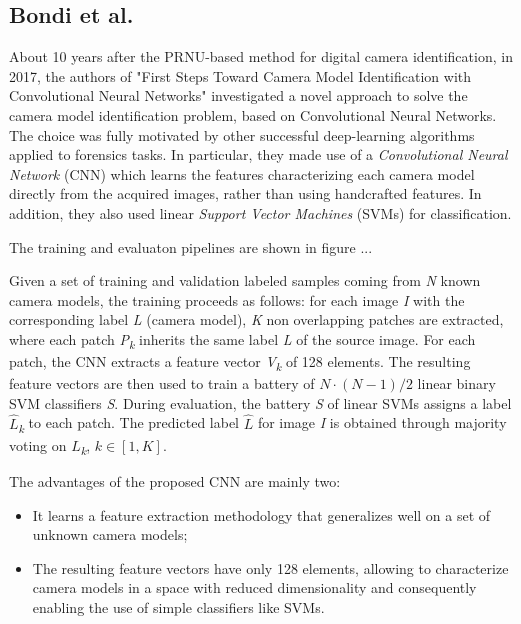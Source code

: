 \subsection{Bondi et al.}
About 10 years after the PRNU-based method for digital camera identification, in 2017, the authors of "First Steps Toward Camera Model Identification with Convolutional Neural Networks" investigated a novel approach to solve the camera model identification problem, based on Convolutional Neural Networks. The choice was fully motivated by other successful deep-learning algorithms applied to forensics tasks.
In particular, they made use of a \textit{Convolutional Neural Network} (CNN) which learns the features characterizing each camera model directly from the acquired images, rather than using handcrafted features. In addition, they also used linear \textit{Support Vector Machines} (SVMs) for classification.

The training and evaluaton pipelines are shown in figure ...

Given a set of training and validation labeled samples coming from \textit{N} known camera models, the training proceeds as follows:
for each image \textit{I} with the corresponding label \textit{L} (camera model), \textit{K} non overlapping patches are extracted, where each patch \textit{P\textsubscript{k}} inherits the same label \textit{L} of the source image. For each patch, the CNN extracts a feature vector \textit{V\textsubscript{k}} of 128 elements. The resulting feature vectors are then used to train a battery of $ N \cdot (N - 1)/2 $ linear binary SVM classifiers \textit{S}. 
During evaluation, the battery \textit{S} of linear SVMs assigns a label $\hat{L}$\textit{\textsubscript{k}} to each patch. The predicted label $\hat{L}$ for image \textit{I} is obtained through majority voting on $\hat{L}$\textit{\textsubscript{k}}, $k \in [1, K]$.

The advantages of the proposed CNN are mainly two:
\begin{itemize}
	\item It learns a feature extraction methodology that generalizes well on a set of unknown camera models;
	\item The resulting feature vectors have only 128 elements, allowing to characterize camera models in a space with reduced dimensionality and  consequently enabling the use of simple classifiers like SVMs.
\end{itemize}

